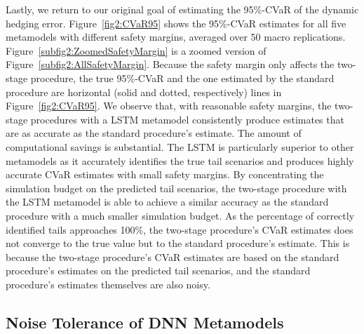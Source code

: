 Lastly, we return to our original goal of estimating the 95\%-CVaR of the dynamic hedging error.
Figure~\ref{fig2:CVaR95} shows the 95\%-CVaR estimates for all five metamodels with different safety margins, averaged over 50 macro replications.
Figure~\ref{subfig2:ZoomedSafetyMargin} is a zoomed version of Figure~\ref{subfig2:AllSafetyMargin}.
Because the safety margin only affects the two-stage procedure, the true 95\%-CVaR and the one estimated by the standard procedure are horizontal (solid and dotted, respectively) lines in Figure~\ref{fig2:CVaR95}.
We observe that, with reasonable safety margins, the two-stage procedures with a LSTM metamodel consistently produce estimates that are as accurate as the standard procedure's estimate.
The amount of computational savings is substantial.
The LSTM is particularly superior to other metamodels as it accurately identifies the true tail scenarios and produces highly accurate CVaR estimates with small safety margins.
By concentrating the simulation budget on the predicted tail scenarios, the two-stage procedure with the LSTM metamodel is able to achieve a similar accuracy as the standard procedure with a much smaller simulation budget.
As the percentage of correctly identified tails approaches 100\%, the two-stage procedure's CVaR estimates does not converge to the true value but to the standard procedure's estimate.
This is because the two-stage procedure's CVaR estimates are based on the standard procedure's estimates on the predicted tail scenarios, and the standard procedure's estimates themselves are also noisy.


\subsection{Noise Tolerance of DNN Metamodels} \label{subsec2:noiseTolerance}

